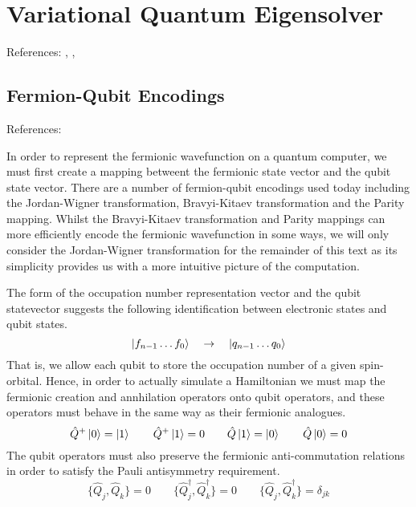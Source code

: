 \section{\label{vqe}Variational Quantum Eigensolver}
References: \cite{Anand2021}, \cite{McClean2016}, \cite{Chan2021}

\subsection{\label{fermion-qubit-encodings}Fermion-Qubit Encodings}
References: \cite{Seeley2020}

In order to represent the fermionic wavefunction on a quantum computer, we must first create a mapping betweent the fermionic state vector and the qubit state vector. There are a number of fermion-qubit encodings used today including the Jordan-Wigner transformation, Bravyi-Kitaev transformation and the Parity mapping. Whilst the Bravyi-Kitaev transformation and Parity mappings can more efficiently encode the fermionic wavefunction in some ways, we will only consider the Jordan-Wigner transformation for the remainder of this text as its simplicity provides us with a more intuitive picture of the computation.

The form of the occupation number representation vector and the qubit statevector suggests the following identification between electronic states and qubit states.
\begin{equation*}
    \ket{f_{n-1} \dots f_{0}} \quad\rightarrow\quad \ket{q_{n-1} \dots q_{0}}
\end{equation*}
That is, we allow each qubit to store the occupation number of a given spin-orbital. Hence, in order to actually simulate a Hamiltonian we must map the fermionic creation and annhilation operators onto qubit operators, and these operators must behave in the same way as their fermionic analogues.
\begin{equation*}
    \hat Q^+ \ket 0 = \ket 1 \qquad
    \hat Q^+ \ket 1 = 0 \qquad
    \hat Q \ket 1 = \ket 0 \qquad
    \hat Q \ket 0 = 0
\end{equation*}
The qubit operators must also preserve the fermionic anti-commutation relations in order to satisfy the Pauli antisymmetry requirement.
\begin{equation*}
    \{ \hat Q_{j}, \hat Q_{k} \} = 0 \qquad
    \{ \hat Q_{j}^{\dagger}, \hat Q_{k}^{\dagger} \} = 0 \qquad
    \{ \hat Q_{j}, \hat Q_{k}^{\dagger} \} = \delta_{jk}
\end{equation*}

